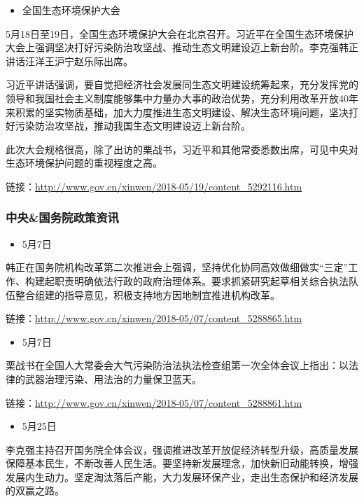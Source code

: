 \documentclass[]{book}
\providecommand{\tightlist}{%
  \setlength{\itemsep}{0pt}\setlength{\parskip}{0pt}}
\begin{document}
\begin{itemize}
\tightlist
\item
  全国生态环境保护大会
\end{itemize}

5月18日至19日，全国生态环境保护大会在北京召开。习近平在全国生态环境保护大会上强调坚决打好污染防治攻坚战、推动生态文明建设迈上新台阶。李克强韩正讲话汪洋王沪宁赵乐际出席。

习近平讲话强调，要自觉把经济社会发展同生态文明建设统筹起来，充分发挥党的领导和我国社会主义制度能够集中力量办大事的政治优势，充分利用改革开放40年来积累的坚实物质基础，加大力度推进生态文明建设、解决生态环境问题，坚决打好污染防治攻坚战，推动我国生态文明建设迈上新台阶。

此次大会规格很高，除了出访的栗战书，习近平和其他常委悉数出席，可见中央对生态环境保护问题的重视程度之高。

链接：\url{http://www.gov.cn/xinwen/2018-05/19/content_5292116.htm}

\subsubsection*{中央\&国务院政策资讯}\label{-1}

\begin{itemize}
\tightlist
\item
  5月7日
\end{itemize}

韩正在国务院机构改革第二次推进会上强调，坚持优化协同高效做细做实``三定''工作、构建起职责明确依法行政的政府治理体系。要求抓紧研究起草相关综合执法队伍整合组建的指导意见，积极支持地方因地制宜推进机构改革。

链接：\url{http://www.gov.cn/xinwen/2018-05/07/content_5288865.htm}

\begin{itemize}
\tightlist
\item
  5月7日
\end{itemize}

栗战书在全国人大常委会大气污染防治法执法检查组第一次全体会议上指出：以法律的武器治理污染、用法治的力量保卫蓝天。

链接：\url{http://www.gov.cn/xinwen/2018-05/07/content_5288861.htm}

\begin{itemize}
\tightlist
\item
  5月25日
\end{itemize}

李克强主持召开国务院全体会议，强调推进改革开放促经济转型升级，高质量发展保障基本民生，不断改善人民生活。要坚持新发展理念，加快新旧动能转换，增强发展内生动力。坚定淘汰落后产能，大力发展环保产业，走出生态保护和经济发展的双赢之路。
\end{document}

